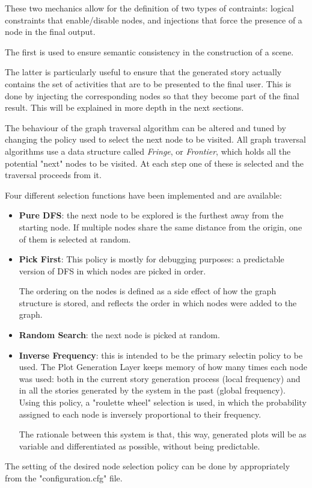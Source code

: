 \documentclass[12pt,a4paper,oneside]{report}
\begin{document}
\bigskip

\bigskip

These two mechanics allow for the definition of two types of contraints: logical constraints that enable/disable nodes, and injections that force the presence of a node in the final output.

The first is used to ensure semantic consistency in the construction of a scene. 

The latter is particularly useful to ensure that the generated story actually contains the set of activities that are to be presented to the final user. This is done by injecting the corresponding nodes so that they become part of the final result. This will be explained in more depth in the next sections.

\bigskip

The behaviour of the graph traversal algorithm can be altered and tuned by changing the policy used to select the next node to be visited. All graph traversal algorithms use a data structure called \textit{Fringe}, or \textit{Frontier}, which holds all the potential "next" nodes to be visited. At each step one of these is selected and the traversal proceeds from it.

Four different selection functions have been implemented and are available:

\begin{itemize}\setlength{\itemsep}{0pt}
\item \textbf{Pure DFS}: the next node to be explored is the furthest away from the starting node. If multiple nodes share the same distance from the origin, one of them is selected at random.
\item \textbf{Pick First}: This policy is mostly for debugging purposes: a predictable version of DFS in which nodes are picked in order.

The ordering on the nodes is defined as a side effect of how the graph structure is stored, and reflects the order in which nodes were added to the graph. 
\item \textbf{Random Search}: the next node is picked at random.
\item \textbf{Inverse Frequency}: this is intended to be the primary selectin policy to be used. The Plot Generation Layer keeps memory of how many times each node was used: both in the current story generation process (local frequency) and in all the stories generated by the system in the past (global frequency). Using this policy, a "roulette wheel" selection is used, in which the probability assigned to each node is inversely proportional to their frequency.

The rationale between this system is that, this way, generated plots will be as variable and differentiated as possible, without being predictable.
\end{itemize}
The setting of the desired node selection policy can be done by appropriately from the "configuration.cfg" file.
\end{document}
